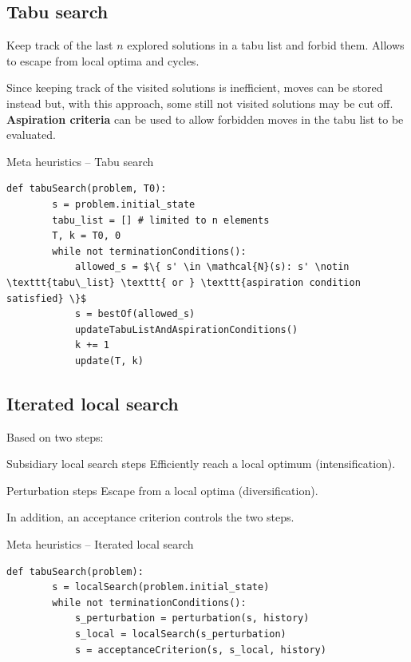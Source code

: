 \subsection{Tabu search}
Keep track of the last $n$ explored solutions in a tabu list and forbid them.
Allows to escape from local optima and cycles.

Since keeping track of the visited solutions is inefficient, 
moves can be stored instead but, with this approach, some still not visited solutions may be cut off.
\textbf{Aspiration criteria} can be used to allow forbidden moves in the tabu list to be evaluated.

\begin{algorithm}
\caption{Meta heuristics -- Tabu search}
\begin{lstlisting}[mathescape=true]
    def tabuSearch(problem, T0):
        s = problem.initial_state
        tabu_list = [] # limited to n elements
        T, k = T0, 0
        while not terminationConditions():
            allowed_s = $\{ s' \in \mathcal{N}(s): s' \notin \texttt{tabu\_list} \texttt{ or } \texttt{aspiration condition satisfied} \}$
            s = bestOf(allowed_s)
            updateTabuListAndAspirationConditions()
            k += 1
            update(T, k)
\end{lstlisting}
\end{algorithm}


\subsection{Iterated local search}
Based on two steps:
\begin{descriptionlist}
    \item[Subsidiary local search steps] Efficiently reach a local optimum (intensification).
    \item[Perturbation steps] Escape from a local optima (diversification).
\end{descriptionlist}
In addition, an acceptance criterion controls the two steps.

\begin{algorithm}
\caption{Meta heuristics -- Iterated local search}
\begin{lstlisting}[mathescape=true]
    def tabuSearch(problem):
        s = localSearch(problem.initial_state)
        while not terminationConditions():
            s_perturbation = perturbation(s, history)
            s_local = localSearch(s_perturbation)
            s = acceptanceCriterion(s, s_local, history)
\end{lstlisting}
\end{algorithm}


